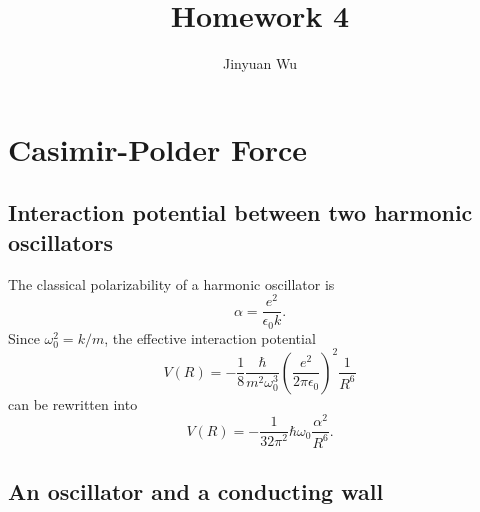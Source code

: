\documentclass[hyperref, a4paper]{article}
\title{Homework 4}
\author{Jinyuan Wu}
\begin{document}
\maketitle

\section{Casimir-Polder Force}

\subsection{Interaction potential between two harmonic oscillators}

The classical polarizability of a harmonic oscillator is 
\begin{equation}
    \alpha = \frac{ e^2}{\epsilon_0 k}.
\end{equation}
Since $\omega_0^2 = k / m$, the effective interaction potential 
\begin{equation}
    V(R) = - \frac{1}{8} \frac{\hbar}{m^2 \omega_0^3} \left(\frac{e^2}{2 \pi \epsilon_0}\right)^2 \frac{1}{R^6}
\end{equation}
can be rewritten into 
\begin{equation}
    V(R) = - \frac{1}{32 \pi^2} \hbar \omega_0 \frac{\alpha^2}{R^6}.
\end{equation}

\subsection{An oscillator and a conducting wall}
\end{document}
